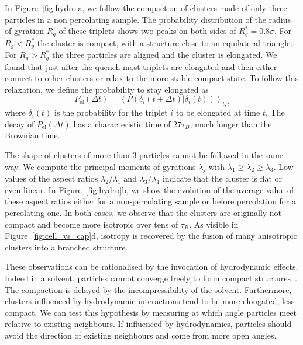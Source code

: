 In Figure~\ref{fig:hydro}a, we follow the compaction of clusters made of only three particles in a non percolating sample. The probability distribution of the radius of gyration $R_g$ of these triplets shows two peaks on both sides of $R_g^*=0.8\sigma$. For $R_g<R_g^*$ the cluster is compact, with a structure close to an equilateral triangle. For $R_g>R_g^*$ the three particles are aligned and the cluster is elongated. We found that just after the quench most triplets are elongated and then either connect to other clusters or relax to the more stable compact state. To follow this relaxation, we define the probability to stay elongated as
\begin{equation}
P_\text{el}(\Delta t) = \left\langle P\left(\delta_i(t+\Delta t)|\delta_i(t)\right)\right\rangle_{t,i}
\end{equation}
where $\delta_i(t)$ is the probability for the triplet $i$ to be elongated at time $t$. The decay of $P_\text{el}(\Delta t)$ has a characteristic time of $27\tau_B$, much longer than the Brownian time. 

The shape of clusters of more than 3 particles cannot be followed in the same way. We compute the principal moments of gyrations $\lambda_j$ with $\lambda_1\geq\lambda_2\geq\lambda_3$. Low values of the aspect ratios $\lambda_2/\lambda_1$ and $\lambda_3/\lambda_1$ indicate that the cluster is flat or even linear. In Figure~\ref{fig:hydro}b, we show the evolution of the average value of these aspect ratios either for a non-percolating sample or before percolation for a percolating one. In both cases, we observe that the clusters are originally not compact and become more isotropic over tens of $\tau_B$. As visible in Figure~\ref{fig:cell_vs_cap}d, isotropy is recovered by the fusion of many anisotropic clusters into a branched structure. 




These observations can be rationalised by the invocation of hydrodynamic effects. Indeed in a solvent, particles cannot converge freely to form compact structures~\cite{Furukawa2010}. The compaction is delayed by the incompressibility of the solvent. Furthermore, clusters influenced by hydrodynamic interactions tend to be more elongated, less compact. We can test this hypothesis by measuring at which angle particles meet relative to existing neighbours. If influenced by hydrodynamics, particles should avoid the direction of existing neighbours and come from more open angles.

